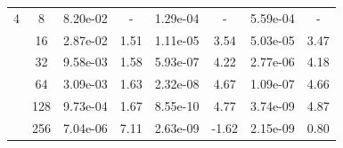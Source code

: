 \begin{table}[htbp]
\begin{center}
\begin{tabular}{| c | c | c c | c c | c c |}
			\hline

			4	& 8 & 8.20e-02 & - & 1.29e-04 & - & 5.59e-04 & - \\
			& 16 & 2.87e-02 & 1.51 & 1.11e-05 & 3.54 & 5.03e-05 & 3.47 \\
			& 32 & 9.58e-03 & 1.58 & 5.93e-07 & 4.22 & 2.77e-06 & 4.18 \\
			& 64 & 3.09e-03 & 1.63 & 2.32e-08 & 4.67 & 1.09e-07 & 4.66 \\
			& 128 & 9.73e-04 & 1.67 & 8.55e-10 & 4.77 & 3.74e-09 & 4.87 \\
			& 256 & 7.04e-06 & 7.11 & 2.63e-09 & -1.62 & 2.15e-09 & 0.80 \\

			\hline
		\end{tabular}
	\end{center}
\end{table}


